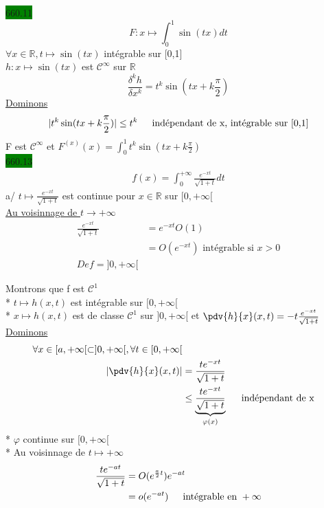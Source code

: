 \documentclass{article}
\begin{document}
\noindent \colorbox{green}{660.11}\\
\begin{equation*}
    F : x \mapsto \int_{0}^{1}\sin (tx) dt
\end{equation*}
\(\forall x \in \mathbb{R}, t \mapsto \sin(tx)\) intégrable 
sur [0,1]\\
\(h : x \mapsto \sin(tx)\) est \(\mathcal{C}^{\infty}\) sur \(\mathbb{R}\)\\
\begin{equation*}
    \frac{\delta^{k} h}{\delta x^{k}} = t^{k}\sin(tx + k \frac{\pi}{2})
\end{equation*}
\underline{Dominons}\\
\begin{align*}
  |t^{k}\sin(tx + k \frac{\pi}{2})| \leq t^{k} \indent \text{indépendant de x, intégrable sur [0,1]}
\end{align*}
F est \(\mathcal{C}^{\infty}\) et \(F^{(x)}(x) = \int_{0}^{1}t^{k}\sin(tx + k \frac{\pi}{2})\)\\

\noindent \colorbox{green}{660.13}\\ 
\begin{align*}
    f(x) = \int_{0}^{+\infty}\frac{e^{-x t}}{\sqrt{1 + t}} dt 
\end{align*}
a/ \(t \mapsto \frac{e^{-x t}}{\sqrt{1 + t}}\) est continue
pour \(x \in \mathbb{R}\) sur \([0, +\infty[\)\\
\underline{Au voisinnage de \(t \rightarrow +\infty\)}\\ 
\begin{align*}
  \frac{e^{-xt}}{\sqrt{1+t}} &= e^{-xt}O(1)\\ 
                             &= O(e^{-xt}) \text{ intégrable si } x > 0\\
                             Def = ]0, +\infty[
\end{align*}

\noindent Montrons que f est \(\mathcal{C}^{1}\)\\ 
* \(t \mapsto h(x,t)\) est intégrable sur \([0, +\infty[\)\\
* \(x \mapsto h(x,t)\) est de classe \(\mathcal{C}^{1}\) sur \(]0, +\infty[\)
et \(\pdv{h}{x}(x,t) = -t \frac{e^{-x t}}{\sqrt{1 + t}}\)\\
\underline{Dominons}\\
\begin{align*}
  \forall x \in [a, +\infty[ \subset ]0, +\infty[, \forall t \in [0, +\infty[\\ 
  |\pdv{h}{x}(x,t)| &= \frac{te^{- xt}}{\sqrt{1+t}}\\ 
                    &\leq \underbrace{\frac{t e^{-x t}}{\sqrt{1+t}}}_{\varphi(x)} \indent \text{indépendant de x}
\end{align*}
* \(\varphi\) continue sur \([0, +\infty[\)\\
* Au voisinnage de \(t \mapsto +\infty\)
\begin{align*}
  \frac{t e^{-a t}}{\sqrt{1+t}} &= O(e^{\frac{a}{2}t})e^{-a t}\\ 
                                &= o(e^{-a t}) \indent \text{intégrable en } +\infty
\end{align*}
\end{document}

